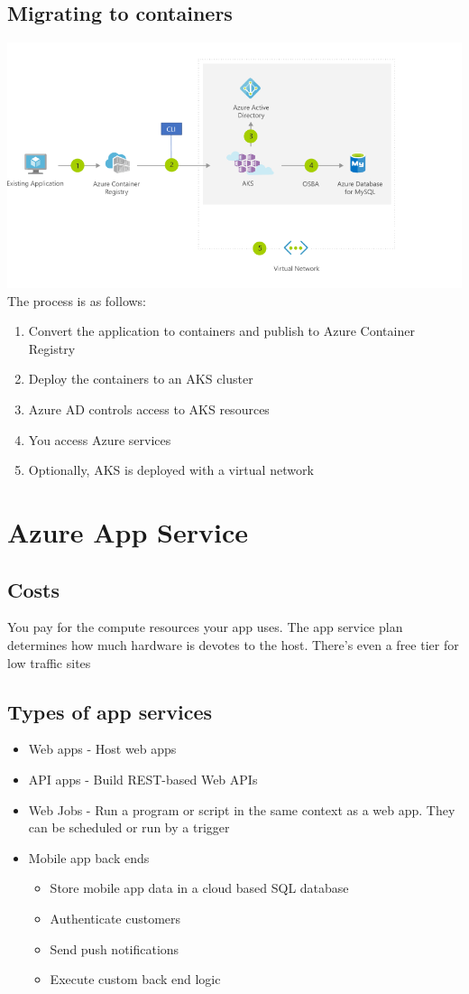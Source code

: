 \documentclass{article}[18pt]
\begin{document}
\subsection{Migrating to containers}
\includegraphics[width=15cm]{4-kub-migration}\\
The process is as follows:
\begin{enumerate}
	\item Convert the application to containers and publish to Azure Container Registry
	\item Deploy the containers to an AKS cluster
	\item Azure AD controls access to AKS resources
	\item You access Azure services
	\item Optionally, AKS is deployed with a virtual network
\end{enumerate}
\section{Azure App Service}
\subsection{Costs}
You pay for the compute resources your app uses. The app service plan determines how much hardware is devotes to the host. There's even a free tier for low traffic sites
\subsection{Types of app services}
\begin{itemize}
	\item Web apps - Host web apps
	\item API apps - Build REST-based Web APIs
	\item Web Jobs - Run a program or script in the same context as a web app. They can be scheduled or run by a trigger
	\item Mobile app back ends
	\begin{itemize}
		\item Store mobile app data in a cloud based SQL database
		\item Authenticate customers
		\item Send push notifications
		\item Execute custom back end logic
	\end{itemize}
\end{itemize}
\end{document}
